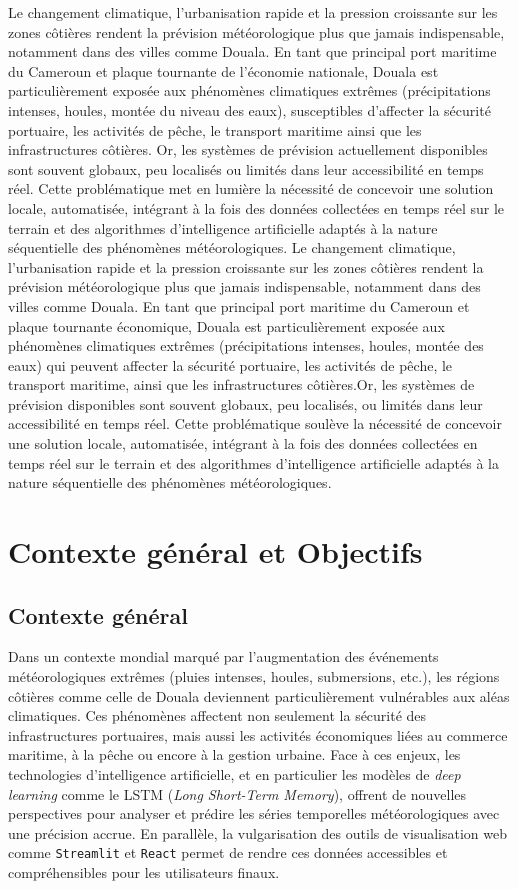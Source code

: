 \documentclass[a4paper,12pt,openany]{report}
\begin{document}
	Le changement climatique, l'urbanisation rapide et la pression croissante sur les zones côtières rendent la prévision météorologique plus que jamais indispensable, notamment dans des villes comme Douala. En tant que principal port maritime du Cameroun et plaque tournante de l'économie nationale, Douala est particulièrement exposée aux phénomènes climatiques extrêmes (précipitations intenses, houles, montée du niveau des eaux), susceptibles d'affecter la sécurité portuaire, les activités de pêche, le transport maritime ainsi que les infrastructures côtières. Or, les systèmes de prévision actuellement disponibles sont souvent globaux, peu localisés ou limités dans leur accessibilité en temps réel. Cette problématique met en lumière la nécessité de concevoir une solution locale, automatisée, intégrant à la fois des données collectées en temps réel sur le terrain et des algorithmes d'intelligence artificielle adaptés à la nature séquentielle des phénomènes météorologiques.
	\quad Le changement climatique, l’urbanisation rapide et la pression croissante sur les zones côtières rendent la prévision météorologique  plus que jamais indispensable, notamment dans des villes comme Douala. En tant que principal port maritime du Cameroun et plaque tournante économique, Douala est particulièrement exposée aux phénomènes climatiques extrêmes (précipitations intenses, houles, montée des eaux) qui peuvent affecter la sécurité portuaire, les activités de pêche, le transport maritime, ainsi que les infrastructures côtières.Or, les systèmes de prévision disponibles sont souvent globaux, peu localisés, ou limités dans leur accessibilité en temps réel. Cette problématique soulève la nécessité de concevoir une solution locale, automatisée, intégrant à la fois des données collectées en temps réel sur le terrain et des algorithmes d’intelligence artificielle adaptés à la nature séquentielle des phénomènes météorologiques.

\section{Contexte général et Objectifs}
	
\subsection{Contexte général}
	\quad
	Dans un contexte mondial marqué par l’augmentation des événements météorologiques extrêmes (pluies intenses, houles, submersions, etc.), les régions côtières comme celle de Douala deviennent particulièrement vulnérables aux aléas climatiques. Ces phénomènes affectent non seulement la sécurité des infrastructures portuaires, mais aussi les activités économiques liées au commerce maritime, à la pêche ou encore à la gestion urbaine. Face à ces enjeux, les technologies d’intelligence artificielle, et en particulier les modèles de \emph{deep learning} comme le LSTM (\textit{Long Short-Term Memory}), offrent de nouvelles perspectives pour analyser et prédire les séries temporelles météorologiques avec une précision accrue. En parallèle, la vulgarisation des outils de visualisation web comme \texttt{Streamlit} et \texttt{React} permet de rendre ces données accessibles et compréhensibles pour les utilisateurs finaux.
	
\end{document}
